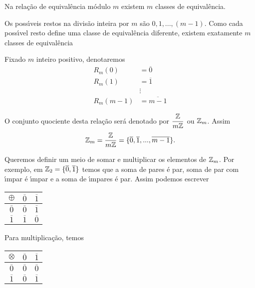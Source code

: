 \begin{proposicao}
    Na rela{\c c}{\~a}o de equival{\^e}ncia m{\'o}dulo $m$ existem $m$ classes de equival{\^e}ncia.
\end{proposicao}
\begin{prova}
    Os poss{\'\i}veis restos na divis{\~a}o inteira por $m$ s{\~a}o $0,1,...,(m-1)$. Como cada poss{\'\i}vel resto define uma classe de equival{\^e}ncia diferente, existem exatamente $m$ classes de equival{\^e}ncia
\end{prova}

\begin{observacao}
Fixado $m$ inteiro positivo, denotaremos
\begin{align*}
    R_{m}(0) &= \overline{0}\\
    R_{m}(1) &= \overline{1}\\
    &\vdots\\
    R_{m}(m-1) &= \overline{m-1}
\end{align*}

O conjunto quociente desta rela{\c c}{\~a}o ser{\'a} denotado por $\displaystyle\frac{\mathbb{Z}}{m\mathbb{Z}}$ ou $\mathbb{Z}_m$. Assim
\[
    \mathbb{Z}_m = \displaystyle\frac{\mathbb{Z}}{m\mathbb{Z}}=\{\overline{0},\overline{1},...,\overline{m-1}\}.
\]
\end{observacao}

Queremos definir um meio de somar e multiplicar os elementos de $\mathbb{Z}_m$. Por exemplo, em $\mathbb{Z}_2 = \{\overline{0},\overline{1}\}$ temos que a soma de pares {\'e} par, soma de par com {\'\i}mpar {\'e} {\'\i}mpar e a soma de {\'\i}mpares {\'e} par. Assim podemos escrever

\begin{table}[h]
   \centering
   \setlength{\arrayrulewidth}{0,5\arrayrulewidth}
   \begin{tabular}{|c|c|c|}
      \hline
      $\oplus$ & $\overline{0}$ & $\overline{1}$ \T\\
      \hline
      $\overline{0}$ & $\overline{0}$ & $\overline{1}$\T\\
      \hline
      $\overline{1}$ & $\overline{1}$ & $\overline{0}$\T\\
      \hline
   \end{tabular}
\end{table}

Para multiplica{\c c}{\~a}o, temos

\begin{table}[h]
   \centering
   \setlength{\arrayrulewidth}{0,5\arrayrulewidth}
   \begin{tabular}{|c|c|c|}
      \hline
      $\otimes$ & $\overline{0}$ & $\overline{1}$\T\\
      \hline
      $\overline{0}$ & $\overline{0}$ & $\overline{0}$\T\\
      \hline
      $\overline{1}$ & $\overline{0}$ & $\overline{1}$\T\\
      \hline
   \end{tabular}
\end{table}

